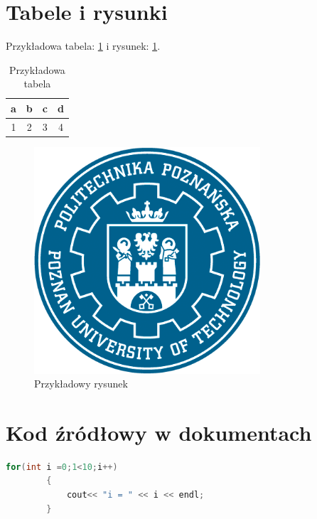 \documentclass[10pt,a4paper]{article}
\begin{document}
	\section{Tabele i rysunki}
	
	Przykładowa tabela: \ref{tab} i rysunek: \ref{rys}.
	
	\begin{table}[h!]
		\centering
		\caption{Przykładowa tabela}
		\label{tab}
		\begin{tabular}{c|c|c|c}
			a & b & c & d \\ \hline
			1 & 2 & 3 & 4
		\end{tabular}
	\end{table}

	\begin{figure}[h!]
		\centering
		\includegraphics[width=0.75\textwidth]{Rys/pp-putlogopelne.png}
		\caption{Przykładowy rysunek}
		\label{rys}
	\end{figure}

\section{Kod źródłowy w dokumentach}

	\begin{lstlisting}[language=C++]
		for(int i =0;1<10;i++)
		{ 
			cout<< "i = " << i << endl;
		}
	\end{lstlisting}

			
	
\end{document}
